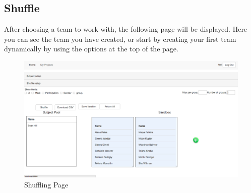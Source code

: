 \subsection{Shuffle}\par
After choosing a team to work with, the following page will be displayed.  Here you can see the team you have created, or start by creating your first team dynamically by using the options at the top of the page.\par
 \begin{figure}[H] 
	\centering
	\includegraphics[width=13cm]{./graphics/Shuffle.jpg}\par
	\caption{Shuffling Page}
\end{figure}

